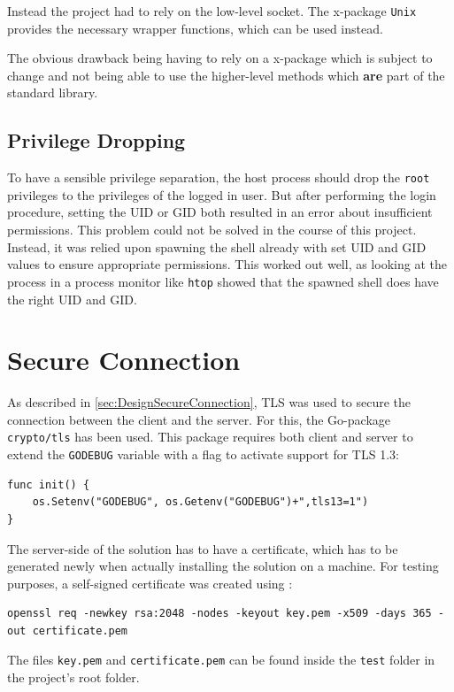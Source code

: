 \documentclass[10pt,a4paper,titlepage,twoside,english,final]{zhawreprt}
\begin{document}
Instead the project had to rely on the low-level \gls{socket}.
The \gls{x-package} \texttt{Unix} provides the necessary wrapper functions, which can be used instead.

The obvious drawback being having to rely on a \gls{x-package} which is subject to change and not being able to use the higher-level methods which \textbf{are} part of the standard library.

\subsection{Privilege Dropping}\label{ssec:PrivilegeDropping}
To have a sensible privilege separation, the host process should drop the \texttt{root} privileges to the privileges of the logged in user.
But after performing the \gls{login} procedure, setting the \gls{UID} or \gls{GID} both resulted in an error about insufficient permissions.
This problem could not be solved in the course of this project.
Instead, it was relied upon spawning the \gls{shell} already with set \gls{UID} and \gls{GID} values to ensure appropriate permissions.
This worked out well, as looking at the process in a process monitor like \texttt{htop} showed that the spawned \gls{shell} does have the right \gls{UID} and \gls{GID}.


\section{Secure Connection}\label{sec:ImplSecureConnection}
As described in \ref{sec:DesignSecureConnection}, \gls{TLS} was used to secure the connection between the client and the server.
For this, the \gls{Go}-package \texttt{crypto/tls} has been used.
This package requires both client and server to extend the \texttt{GODEBUG} variable with a flag to activate support for \gls{TLS} 1.3:
\setlistingGo
\begin{lstlisting}[caption={Activating \gls{TLS} 1.3 in \gls{Go}},label=lst:TlsInGo]
func init() {
    os.Setenv("GODEBUG", os.Getenv("GODEBUG")+",tls13=1")
}
\end{lstlisting}
The server-side of the solution has to have a certificate, which has to be generated newly when actually installing the solution on a machine.
For testing purposes, a self-signed certificate was created using \cite{openssl}:
\setlistingBash
\begin{lstlisting}[caption={Generating a self-signed certificate and private key},label=lst:GenCertNKey]
openssl req -newkey rsa:2048 -nodes -keyout key.pem -x509 -days 365 -out certificate.pem
\end{lstlisting}
The files \texttt{key.pem} and \texttt{certificate.pem} can be found inside the \texttt{test} folder in the project's root folder.
\end{document}

